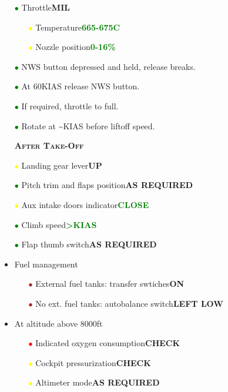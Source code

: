 \documentclass[a4paper,12pt,dvipsnames]{letter}
\newcommand{\button}[1]{\textbf{#1}}
\newcommand{\degC}{\textdegree{}C}
\newcommand{\ok}[1]{\textcolor{Green}{\textbf{#1}}}
\newcommand{\myHead}[1]{{\LARGE\textsc{\textbf{#1}}}}
\newcommand{\ri}{\textcolor{Red}{$\bullet$\;}}
\newcommand{\gi}{\textcolor{Green}{$\bullet$\;}}
\newcommand{\yi}{\textcolor{Yellow}{$\bullet$\;}}
\renewcommand{\ni}{\textcolor{Brown}{$\bullet$\;}}
\begin{document}
{\begin{itemize}
 \item[\gi] Throttle\dotfill\button{MIL}
\begin{itemize}
 \item[\yi] Temperature\dotfill\ok{665-675\degC}
 \item[\yi] Nozzle position\dotfill\ok{0-16\;\%}
\end{itemize}
 \item[\gi] NWS button depressed and held, release breaks.
 \item[\gi] At 60\;KIAS release NWS button.
 \item[\gi] If required, throttle to full.
 \item[\gi] Rotate at \textasciitilde{}\;KIAS before liftoff speed.
\end{itemize}
\newpage
\begin{itemize}
 \item[] \myHead{After Take-Off}
 \item[\yi] Landing gear lever\dotfill\button{UP}
 \item[\gi] Pitch trim and flaps position\dotfill\button{AS REQUIRED}
 \item[\yi] Aux intake doors indicator\dotfill\ok{CLOSE}
 \item[\gi] Climb speed\dotfill\ok{>\;KIAS}
 \item[\gi] Flap thumb switch\dotfill\button{AS REQUIRED}
 \item Fuel management
 \begin{itemize}
 \item[\ni] External fuel tanks: transfer swtiches\dotfill\button{ON}
 \item[\ni] No ext. fuel tanks: autobalance switch\dotfill\button{LEFT LOW}
 \end{itemize}
 \item At altitude above 8000\;ft
 \begin{itemize}
 \item[\ri] Indicated oxygen consumption\dotfill\button{CHECK}
 \item[\yi] Cockpit pressurization\dotfill\button{CHECK}
 \item[\yi] Altimeter mode\dotfill\button{AS REQUIRED}
 \end{itemize}
\end{itemize}
\vspace{0.5em}
}
\end{document}
